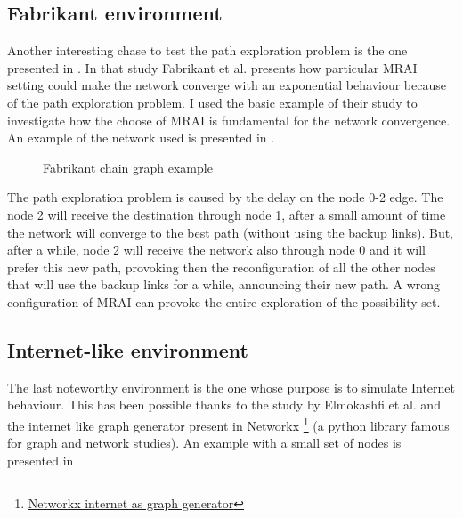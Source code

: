 \subsection{Fabrikant environment}
\label{subsec:fabrikant_env}

Another interesting chase to test the path exploration problem is the one
presented in \cite{fabrikant2011there}.
In that study Fabrikant et al. presents how particular \ac{MRAI} setting could 
make the network converge with an exponential behaviour because of the path
exploration problem.
I used the basic example of their study to investigate how the choose of \ac{MRAI}
is fundamental for the network convergence.
An example of the network used is presented 
in .

\begin{figure}[h]                                                               
    \begin{center}                                                              
        
    \end{center}                                                                
    \caption{Fabrikant chain graph example}                                
    \label{fig:fabrikant_graph}
\end{figure}

The path exploration problem is caused by the delay on the node \num{0}-\num{2}
edge. The node 2 will receive the destination through node 1, after a small amount
of time the network will converge to the best path (without using the backup links).
But, after a while, node \num{2} will receive the network also through node \num{0}
and it will prefer this new path, provoking then the reconfiguration of all
the other nodes that will use the backup links for a while, announcing their 
new path.
A wrong configuration of \ac{MRAI} can provoke the entire exploration of the 
possibility set.

\subsection{Internet-like environment}
\label{subsec:internet_like_env}

The last noteworthy environment is the one whose purpose is to simulate Internet
behaviour.
This has been possible thanks to the study by Elmokashfi et al. \cite{elmokashfi2010scalability}
and the internet like graph generator present in Networkx \footnote{\href{https://networkx.org/documentation/stable/reference/generated/networkx.generators.internet_as_graphs.random_internet_as_graph.html\#networkx.generators.internet_as_graphs.random_internet_as_graph}{Networkx internet as graph generator}}
(a python library famous for graph and network studies).
An example with a small set of nodes is presented in 


